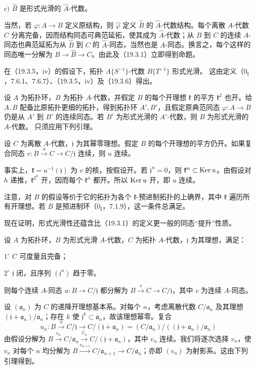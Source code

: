 $c)$ $\widehat B$ 是形式光滑的 $\widehat A$-代数。

当然，若 $\varphi:A\to B$ 定义原结构，则 $\widehat\varphi$ 定义 $\widehat B$ 的 $\widehat A$-代数结构。每个离散 $A$-代数 $C$ 分离完备，因而结构同态可典范延拓，使其成为 $\widehat A$-代数；从 $B$ 到 $C$ 的连续 $A$-同态也典范延拓为从 $\widehat B$ 到 $C$ 的 $\widehat A$-同态，当然也是 $A$-同态。换言之，每个这样的同态唯一分解为 $B\to\widehat B\to C$。由此及（19.3.1）立即得到命题。

在（19.3.5，iv）的假设下，拓扑 $A\{S^{-1}\}$-代数 $B\{T^{-1}\}$ 形式光滑。
这由定义（$0_{\mathrm I}$，7.6.1、7.6.7）、（19.3.5，iv）及（19.3.6）得出。

设 $A$ 为拓扑环，$B$ 为拓扑 $A$-代数，并假定 $B$ 的每个开理想 $\mathfrak k$ 的平方 $\mathfrak k^2$ 也开。给 $A,B$ 配备比原拓扑更细的拓扑，得到拓扑环 $A',B'$，且假定原典范同态 $\varphi:A\to B$ 仍是从 $A'$ 到 $B'$ 的连续同态。若 $B'$ 为形式光滑的 $A'$-代数，则 $B$ 为形式光滑的 $A$-代数。
只须应用下列引理。

设 $C$ 为离散 $A$-代数，$\mathfrak j$ 为其幂零理想。假定 $B$ 的每个开理想的平方仍开。如果复合同态 $v:B\xrightarrow{u}C\to C/\mathfrak j$ 连续，则 $u$ 连续。

事实上，$\mathfrak k=u^{-1}(\mathfrak j)$ 为 $v$ 的核，按假设开。若 $\mathfrak j^n=0$，则 $\mathfrak k^n\subset\operatorname{Ker} u$。由假设对 $h$ 递推，$\mathfrak k^{2^h}$ 开，因而每个 $\mathfrak k^n$ 都开。所以 $\operatorname{Ker} u$ 开，即 $u$ 连续。

注意，对 $B$ 的假设等价于它的拓扑为各个 $\mathfrak k$-预进制拓扑的上确界，其中 $\mathfrak k$ 遍历所有开理想。若 $B$ 是预进制环（$0_{\mathrm I}$，7.1.9），这一条件总满足。

现在证明，形式光滑性还蕴含比（19.3.1）的定义更一般的同态“提升”性质。

设 $A$ 为拓扑环，$B$ 为形式光滑 $A$-代数，$C$ 为拓扑 $A$-代数，$\mathfrak j$ 为其理想，满足：

$1^\circ$ $C$ 可度量且完备；

$2^\circ$ $\mathfrak j$ 闭，且序列 $(\mathfrak j^n)$ 趋于零。

则每个连续 $A$-同态 $u:B\to C/\mathfrak j$ 都分解为 $B\xrightarrow{v}C\to C/\mathfrak j$，其中 $v$ 为连续 $A$-同态。

设 $(\mathfrak a_n)$ 为 $C$ 的递降开理想基本系。对每个 $n$，考虑离散代数 $C/\mathfrak a_n$ 及其理想 $(\mathfrak j+\mathfrak a_n)/\mathfrak a_n$；存在 $k$ 使 $\mathfrak j^k\subset\mathfrak a_n$，故该理想幂零。复合
\[
 u_n:B\xrightarrow{u}C/\mathfrak j\longrightarrow
 C/(\mathfrak j+\mathfrak a_n)
 =(C/\mathfrak a_n)/((\mathfrak j+\mathfrak a_n)/\mathfrak a_n)
\]
由假设分解为 $B\xrightarrow{v_n}C/\mathfrak a_n\xrightarrow{\varphi_n}C/(\mathfrak j+\mathfrak a_n)$，其中 $v_n$ 连续。我们将逐次选择 $v_n$，使 $v_n$ 对每个 $n$ 均分解为 $B\xrightarrow{v_{n+1}}C/\mathfrak a_{n+1}\to C/\mathfrak a_n$；亦即 $(v_n)$ 为射影系。这由下列引理得到。

